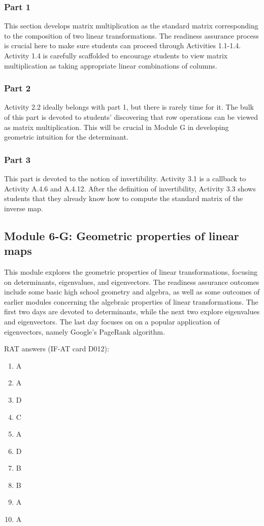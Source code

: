 \documentclass{article}
\begin{document}
\subsubsection*{Part 1}
This section develops matrix multiplication as the standard matrix corresponding to the composition of two linear transformations.  The readiness assurance process is crucial here to make sure students can proceed through Activities 1.1-1.4.  Activity 1.4 is carefully  scaffolded to encourage students to view matrix multiplication as taking appropriate linear combinations of columns. 

\subsubsection*{Part 2}
Activity 2.2 ideally belongs with part 1, but there is rarely time for it.  The bulk of this part is devoted to students' discovering that row operations can be viewed as matrix multiplication.  This will be crucial in Module G in developing geometric intuition for the determinant.

\subsubsection*{Part 3}
This part is devoted to the notion of invertibility.  Activity 3.1 is a callback to Activity A.4.6 and A.4.12.   After the definition of invertibility, Activity 3.3 shows students that they already know how to compute the standard matrix of the inverse map.  

\subsection*{Module 6-G: Geometric properties of linear maps}

This module explores the geometric properties of linear transformations, focusing on determinants, eigenvalues, and eigenvectors.  The readiness assurance outcomes include some basic high school geometry and algebra, as well as some outcomes of earlier modules concerning the algebraic properties of linear transformations.  The first two days are devoted to determinants, while the next two explore eigenvalues and eigenvectors.  The last day focuses on on a popular application of eigenvectors, namely Google's PageRank algorithm.

RAT answers (IF-AT card D012):
\begin{multicols}{10}
\begin{enumerate}[1)]
\item A
\item A
\item D
\item C
\item A
\item D
\item B
\item B
\item A
\item A
\end{enumerate}
\end{multicols}
\end{document}
